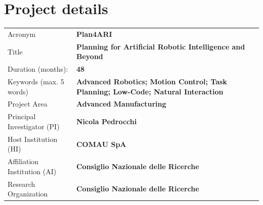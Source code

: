 \section*{Project details}\label{project-details}

{\setlength{\tabcolsep}{0pt}\renewcommand{\arraystretch}{1}%
\noindent\begin{tabular}{@{}>{\raggedright\arraybackslash}p{5.0cm}
                        >{\bfseries}p{11.0cm}@{}}
Acronym & Plan4ARI \\[4pt]
Title & Planning for Artificial Robotic Intelligence and Beyond \\[4pt]
Duration (months): & 48 \\[4pt]
Keywords (max. 5 words) & Advanced Robotics; Motion Control; Task Planning; Low-Code; Natural Interaction \\[4pt]
Project Area & Advanced Manufacturing \\[4pt]
Principal Investigator (PI) & Nicola Pedrocchi \\[4pt]
Host Institution (HI) & COMAU SpA \\[4pt]
Affiliation Institution (AI) & Consiglio Nazionale delle Ricerche \\[4pt]
Research Organization & Consiglio Nazionale delle Ricerche \\
\end{tabular}\par}
\vspace{\baselineskip}
